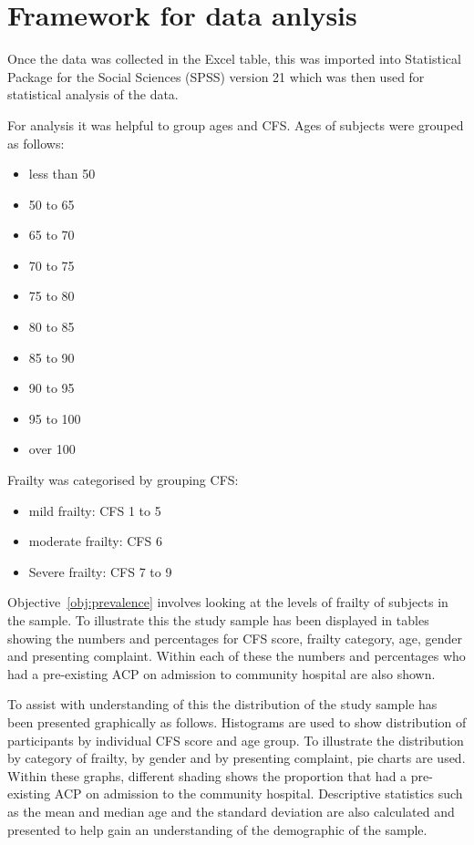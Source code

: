\documentclass
[
	12pt,
	a4paper,
	oneside,
]{report}
\begin{document}
\section{Framework for data anlysis}

Once the data was collected in the Excel table, this was imported into 
Statistical Package for the Social Sciences (SPSS) version 21 which was then
used for statistical analysis of the data.

For analysis it was helpful to group ages and CFS. Ages of subjects were 
grouped as follows:
\begin{itemize}
	\item less than 50
	\item 50 to 65
	\item 65 to 70
	\item 70 to 75
 	\item 75 to 80
	\item 80 to 85
 	\item 85 to 90
 	\item 90 to 95
 	\item 95 to 100
 	\item over 100
\end{itemize}

Frailty was categorised by grouping CFS:
\begin{itemize}
\label{ref:cfs-grouping}
	\item mild frailty: CFS 1 to 5
	\item moderate frailty: CFS 6
	\item Severe frailty: CFS 7 to 9
\end{itemize}

Objective~\ref{obj:prevalence} involves looking at the levels of frailty of
subjects in the sample. To illustrate this the study sample has been 
displayed in tables showing the numbers and percentages for CFS score, 
frailty category, age, gender and presenting complaint. Within each
of these the numbers and percentages who had a pre-existing ACP
on admission to community hospital are also shown.

To assist with understanding of this the distribution of the study sample 
has been presented graphically as follows.
Histograms are used to show distribution of participants by individual 
CFS score and age group.  
To illustrate the distribution by category of frailty, by gender and by presenting 
complaint, pie charts are used. Within these graphs, different shading shows
the proportion that had a pre-existing ACP on admission to the community hospital.
Descriptive statistics such as the mean and median age and the standard deviation
are also calculated and presented to help gain an understanding of the 
demographic of the sample.
\end{document}
